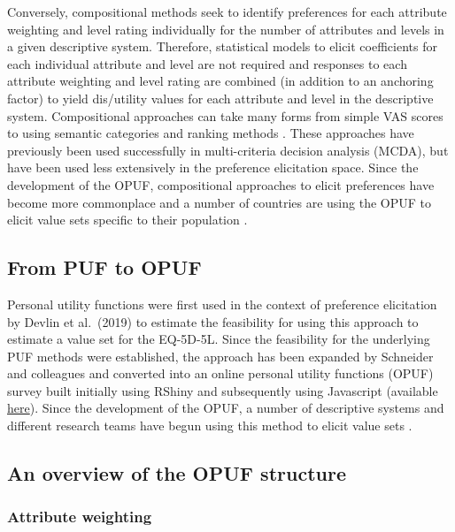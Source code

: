 \documentclass[
  number,
  preprint]{elsarticle}
\begin{document}
Conversely, compositional methods seek to identify preferences for each
attribute weighting and level rating individually for the number of
attributes and levels in a given descriptive system. Therefore,
statistical models to elicit coefficients for each individual attribute
and level are not required and responses to each attribute weighting and
level rating are combined (in addition to an anchoring factor) to yield
dis/utility values for each attribute and level in the descriptive
system. Compositional approaches can take many forms from simple VAS
scores to using semantic categories and ranking methods
\citep{BanaECosta1999TheApplication, Danner2011IntegratingPreferences, Oliveira2018ValuingStates}.
These approaches have previously been used successfully in
multi-criteria decision analysis (MCDA), but have been used less
extensively in the preference elicitation space. Since the development
of the OPUF, compositional approaches to elicit preferences have become
more commonplace and a number of countries are using the OPUF to elicit
value sets specific to their population
\citep{Brodszky2023PCR108States}.

\subsection{From PUF to OPUF}\label{from-puf-to-opuf}

Personal utility functions were first used in the context of preference
elicitation by Devlin et al.~(2019) \citep{Devlin2019AFunctions} to
estimate the feasibility for using this approach to estimate a value set
for the EQ-5D-5L. Since the feasibility for the underlying PUF methods
were established, the approach has been expanded by Schneider and
colleagues \citep{Schneider2022TheStates} and converted into an online
personal utility functions (OPUF) survey built initially using RShiny
and subsequently using Javascript (available
\href{https://eq5d5l.me}{here}). Since the development of the OPUF, a
number of descriptive systems and different research teams have begun
using this method to elicit value sets
\citep{Bray2024DevelopmentImpairment, Brodszky2023PCR108States}.

\subsection{An overview of the OPUF
structure}\label{an-overview-of-the-opuf-structure}

\subsubsection{Attribute weighting}\label{attribute-weighting}
\end{document}
